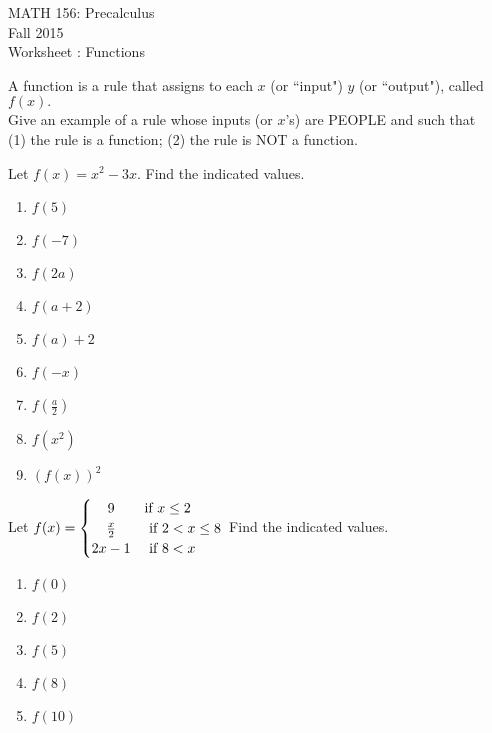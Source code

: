 \documentclass[11pt]{article}
\newcommand{\sect}{\textsection}
\begin{document}
 

\begin{center}MATH 156: Precalculus  \\ Fall 2015 \\ Worksheet \sect 2.1: Functions\end{center}

\hrulefill

 {} A function is a rule that assigns to each $x$ (or ``input")  {\underline{\hspace{2in}} $y$ (or ``output"), called $f(x).$}\\
 
 {} Give an example of a rule whose inputs (or $x$'s) are PEOPLE and such that \\
 
 (1) the rule is a function; (2) the rule is NOT a function.\\

\hrulefill

{} Let $f(x)=x^2-3x.$ Find the indicated values.
\begin{enumerate}
\item $f(5)$
\vspace{.2in}
\item $f(-7)$
\vspace{.2in}
\item $f(2a)$
\vfill
\item $f(a+2)$
\vfill
\item $f(a)+2$
\vfill
\item $f(-x)$
\vfill
\item $f(\frac{a}{2})$
\vfill
\item $f(x^2)$
\vfill
\item $(f(x))^2$
\vfill
\end{enumerate}

\newpage

{} Let $f(x) =
  \begin{cases} 
      \hfill 9 \hfill & \text{if $x \leq2$}\\
      \hfill \frac{x}{2}    \hfill & \text{ if $2 < x \leq 8$} \\
      \hfill 2x-1 \hfill & \text{ if $8<x$} \\
  \end{cases} $
  Find the indicated values.
  \begin{enumerate}
  \item $f(0)$
  \vspace{0.2in}
  \item $f(2)$
  \vspace{0.2in}
  \item $f(5)$
  \vspace{0.2in}
  \item $f(8)$
  \vspace{0.2in}
  \item $f(10)$
  \vspace{0.2in}
  \end{enumerate}
  
\end{document}
